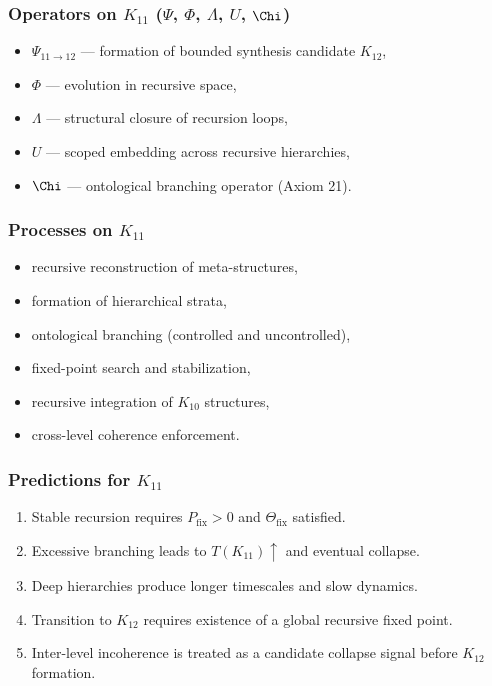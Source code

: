 \subsubsection{Operators on $K_{11}$ ($\Psi$, $\Phi$, $\Lambda$, $U$, $\Chi$)}

\begin{itemize}
    \item $\Psi_{11\to12}$ — formation of bounded synthesis candidate $K_{12}$,
    \item $\Phi$ — evolution in recursive space,
    \item $\Lambda$ — structural closure of recursion loops,
    \item $U$ — scoped embedding across recursive hierarchies,
    \item $\Chi$ — ontological branching operator (Axiom 21).
\end{itemize}

\subsubsection{Processes on $K_{11}$}

\begin{itemize}
    \item recursive reconstruction of meta-structures,
    \item formation of hierarchical strata,
    \item ontological branching (controlled and uncontrolled),
    \item fixed-point search and stabilization,
    \item recursive integration of $K_{10}$ structures,
    \item cross-level coherence enforcement.
\end{itemize}

\subsubsection{Predictions for $K_{11}$}

\begin{enumerate}
    \item Stable recursion requires $P_{\mathrm{fix}}>0$ and $\Theta_{\mathrm{fix}}$ satisfied.
    \item Excessive branching leads to $T(K_{11})\uparrow$ and eventual collapse.
    \item Deep hierarchies produce longer timescales and slow dynamics.
    \item Transition to $K_{12}$ requires existence of a global recursive fixed point.
    \item Inter-level incoherence is treated as a candidate collapse signal before $K_{12}$ formation.
\end{enumerate}

